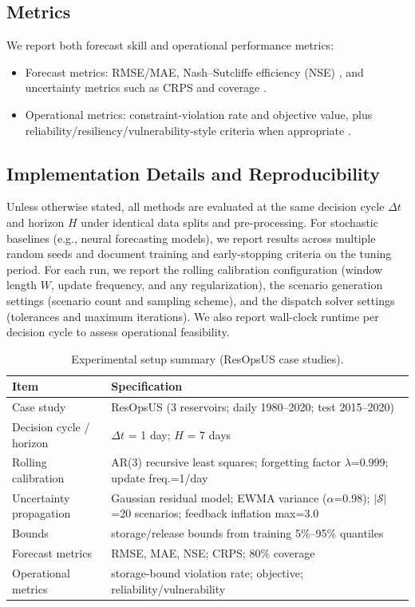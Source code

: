 \documentclass[conference]{IEEEtran}
\begin{document}
\subsection{Metrics}
We report both forecast skill and operational performance metrics:
\begin{itemize}[leftmargin=*]
\item Forecast metrics: RMSE/MAE, Nash--Sutcliffe efficiency (NSE) \cite{nash1970river}, and uncertainty metrics such as
CRPS and coverage \cite{gneiting2007strictly}.
\item Operational metrics: constraint-violation rate and objective value, plus reliability/resiliency/vulnerability-style
criteria when appropriate \cite{hashimoto1982reliability}.
\end{itemize}

\subsection{Implementation Details and Reproducibility}
Unless otherwise stated, all methods are evaluated at the same decision cycle $\Delta t$ and horizon $H$ under identical
data splits and pre-processing. For stochastic baselines (e.g., neural forecasting models), we report results across
multiple random seeds and document training and early-stopping criteria on the tuning period. For each run, we report
the rolling calibration configuration (window length $W$, update frequency, and any regularization), the scenario
generation settings (scenario count and sampling scheme), and the dispatch solver settings (tolerances and maximum
iterations). We also report wall-clock runtime per decision cycle to assess operational feasibility.

\begin{table}[t]
\centering
\caption{Experimental setup summary (ResOpsUS case studies).}
\label{tab:setup}
{\setlength{\tabcolsep}{3pt}\small
\begin{tabular}{p{}p{}}
\toprule
Item & Specification \\
\midrule
Case study & ResOpsUS (3 reservoirs; daily 1980--2020; test 2015--2020) \\
Decision cycle / horizon & $\Delta t$ = 1 day; $H$ = 7 days \\
Rolling calibration & AR(3) recursive least squares; forgetting factor $\lambda$=0.999; update freq.=1/day \\
Uncertainty propagation & Gaussian residual model; EWMA variance ($\alpha$=0.98); $|\mathcal{S}|$=20 scenarios; feedback inflation max=3.0 \\
Bounds & storage/release bounds from training 5\%--95\% quantiles \\
Forecast metrics & RMSE, MAE, NSE; CRPS; 80\% coverage \\
Operational metrics & storage-bound violation rate; objective; reliability/vulnerability \\
\bottomrule
\end{tabular}}
\end{table}
\end{document}
